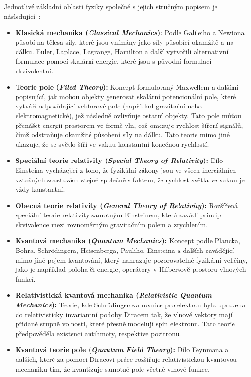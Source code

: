 Jednotlivé základní oblasti fyziky společně s jejich stručným popisem je následující~\cite{NaturalComputing}:
\begin{itemize}
    \item \textbf{Klasická mechanika (\emph{Classical Mechanics}):} 
    Podle Galileiho a Newtona působí na tělesa síly, které jsou vnímány jako síly působící okamžitě a na dálku. 
    Euler, Laplace, Lagrange, Hamilton a další vytvořili alternativní formulace pomocí skalární energie, které jsou s původní formulací ekvivalentní. 
    \item \textbf{Teorie pole (\emph{Filed Theory}):} 
    Koncept formulovaný Maxwellem a dalšími popisující, jak mohou objekty generovat skalární potencionální pole, které vytváří odpovídající vektorové pole (například gravitační nebo elektromagnetické), jež následně ovlivňuje ostatní objekty. 
    Tato pole můžou přenášet energii prostorem ve formě vln, což omezuje rychlost šíření signálů, čímž odstraňuje okamžité působení síly na dálku. 
    Tato teorie mimo jiné ukazuje, že se světlo šíří ve vakuu konstantní konečnou rychlostí. 
    \item \textbf{Speciální teorie relativity (\emph{Special Theory of Relativity}):} 
    Dílo Einsteina vycházející z toho, že fyzikální zákony jsou ve všech inerciálních vztažných soustavách stejné společně s faktem, že rychlost světla ve vakuu je vždy konstantní.
    \item \textbf{Obecná teorie relativity (\emph{General Theory of Relativity}):} 
    Rozšířená speciální teorie relativity samotným Einsteinem, která zavádí princip ekvivalence mezi rovnoměrným gravitačním polem a zrychlením. 
    \item \textbf{Kvantová mechanika (\emph{Quantum Mechanics}):} 
    Koncept podle Plancka, Bohra, Schrö\-din\-ge\-ra, Heisenberga, Pauliho, Einsteina a dalších zavádějící mimo jiné pojem kvantování, který nahrazuje pozorovatelné fyzikální veličiny, jako je například poloha či energie, operátory v Hilbertově prostoru vlnových funkcí.
    \item \textbf{Relativistická kvantová mechanika (\emph{Relativistic Quantum Mechanics}):} 
    Teorie, kde Schrödingerova rovnice pro elektron byla upravena do relativisticky invariantní podoby Diracem tak, že vlnové vektory mají přidané stupně volnosti, které přesně modelují spin elektronu. 
    Tato teorie předpověděla existenci antihmoty, respektive pozitronu. 
    \item \textbf{Kvantová teorie pole (\emph{Quantum Field Theory}):} 
    Dílo Feynmana a dalších, které za pomoci Diracovi práce rozšiřuje relativistickou kvantovou mechaniku tím, že kvantizuje samotné pole včetně vlnové funkce. 

\end{itemize}
